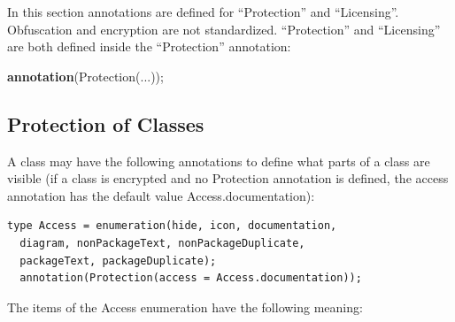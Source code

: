 \documentclass[10pt,a4paper]{report}
\def\doublelabel#1{\label{#1}\hypertarget{#1}{}}
\begin{document}
In this section annotations are defined for ``Protection'' and
``Licensing''. Obfuscation and encryption are not standardized.
``Protection'' and ``Licensing'' are both defined inside the
``Protection'' annotation:

\textbf{annotation}(Protection(...));

\subsection{Protection of Classes}\doublelabel{protection-of-classes}

A class may have the following annotations to define what parts of a
class are visible (if a class is encrypted and no Protection annotation
is defined, the access annotation has the default value
Access.documentation):

\begin{lstlisting}[language=modelica]
  type Access = enumeration(hide, icon, documentation,
  diagram, nonPackageText, nonPackageDuplicate,
  packageText, packageDuplicate);
  annotation(Protection(access = Access.documentation));
\end{lstlisting}
The items of the Access enumeration have the following meaning:
\end{document}
